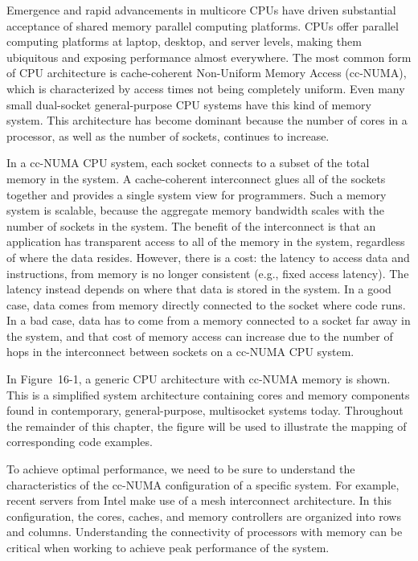 Emergence and rapid advancements in multicore CPUs have driven substantial acceptance of shared memory parallel computing platforms. CPUs offer parallel computing platforms at laptop, desktop, and server levels, making them ubiquitous and exposing performance almost everywhere. The most common form of CPU architecture is cache-coherent Non-Uniform Memory Access (cc-NUMA), which is characterized by access times not being completely uniform. Even many small dual-socket general-purpose CPU systems have this kind of memory system. This architecture has become dominant because the number of cores in a processor, as well as the number of sockets, continues to increase.\par

In a cc-NUMA CPU system, each socket connects to a subset of the total memory in the system. A cache-coherent interconnect glues all of the sockets together and provides a single system view for programmers. Such a memory system is scalable, because the aggregate memory bandwidth scales with the number of sockets in the system. The benefit of the interconnect is that an application has transparent access to all of the memory in the system, regardless of where the data resides. However, there is a cost: the latency to access data and instructions, from memory is no longer consistent (e.g., fixed access latency). The latency instead depends on where that data is stored in the system. In a good case, data comes from memory directly connected to the socket where code runs. In a bad case, data has to come from a memory connected to a socket far away in the system, and that cost of memory access can increase due to the number of hops in the interconnect between sockets on a cc-NUMA CPU system.\par

In Figure 16-1, a generic CPU architecture with cc-NUMA memory is shown. This is a simplified system architecture containing cores and memory components found in contemporary, general-purpose, multisocket systems today. Throughout the remainder of this chapter, the figure will be used to illustrate the mapping of corresponding code examples.\par

To achieve optimal performance, we need to be sure to understand the characteristics of the cc-NUMA configuration of a specific system. For example, recent servers from Intel make use of a mesh interconnect architecture. In this configuration, the cores, caches, and memory controllers are organized into rows and columns. Understanding the connectivity of processors with memory can be critical when working to achieve peak performance of the system.\par

